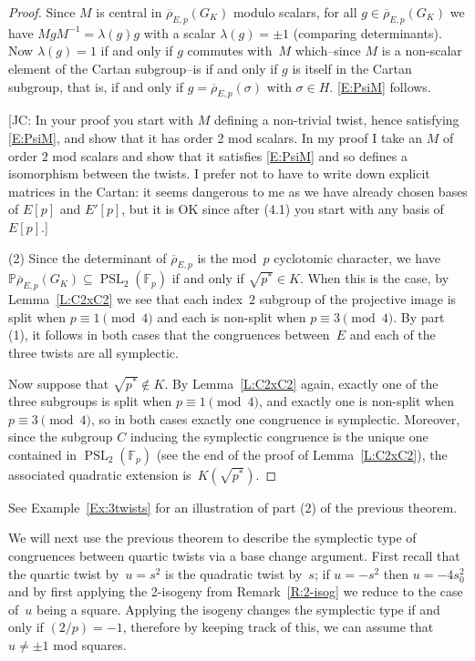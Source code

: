 \documentclass[12pt, reqno]{amsart}
\newcommand{\F}{\mathbb{F}}
\newcommand{\PP}{\mathbb{P}}
\newcommand{\rhobar}{{\overline{\rho}}}
\newcommand{\PSL}{\operatorname{PSL}}
\numberwithin{equation}{section}
\theoremstyle{definition}
\theoremstyle{remark}
\newcommand{\jc}[1]{{\color{darkgreen} \textsf{[JC: #1]}}}
\begin{document}
\begin{proof}
Since $M$ is central in $\rhobar_{E,p}(G_K)$ modulo scalars, for all
$g\in\rhobar_{E,p}(G_K)$ we have $MgM^{-1}=\lambda(g)g$ with a scalar
$\lambda(g)=\pm1$ (comparing determinants).  Now $\lambda(g)=1$ if and
only if $g$ commutes with~$M$ which--since $M$ is a non-scalar element
of the Cartan subgroup--is if and only if $g$ is itself in the Cartan
subgroup, that is, if and only if $g=\rhobar_{E,p}(\sigma)$ with
$\sigma\in H$.  \eqref{E:PsiM} follows.

\jc{In your proof you start with $M$ defining a non-trivial twist,
  hence satisfying \eqref{E:PsiM}, and show that it has order 2 mod
  scalars.  In my proof I take an $M$ of order $2$ mod scalars and
  show that it satisfies \eqref{E:PsiM} and so defines a isomorphism
  between the twists.  I prefer not to have to write down explicit
  matrices in the Cartan: it seems dangerous to me as we have already
  chosen bases of $E[p]$ and $E'[p]$, but it is OK since after (4.1)
  you start with any basis of $E[p]$.}

(2) Since the determinant of $\rhobar_{E,p}$ is the mod~$p$ cyclotomic
character, we have $\PP\rhobar_{E,p}(G_K)\subseteq \PSL_2(\F_p)$ if
and only if $\sqrt{p^*}\in K$.  When this is the case, by
Lemma~\ref{L:C2xC2} we see that each index~$2$ subgroup of the
projective image is split when $p\equiv1\pmod4$ and each is non-split
when $p\equiv3\pmod4$.  By part (1), it follows in both cases that the
congruences between~$E$ and each of the three twists are all
symplectic.

Now suppose that $\sqrt{p^*}\notin K$.  By Lemma~\ref{L:C2xC2} again,
exactly one of the three subgroups is split when $p\equiv1\pmod4$, and
exactly one is non-split when $p\equiv3\pmod4$, so in both cases
exactly one congruence is symplectic.  Moreover, since the subgroup
$C$ inducing the symplectic congruence is the unique one contained in
$\PSL_2(\F_p)$ (see the end of the proof of Lemma~\ref{L:C2xC2}), the
associated quadratic extension is~$K(\sqrt{p^*})$.
\end{proof}

See Example~\ref{Ex:3twists} for an illustration of part (2) of
the previous theorem.


We will next use the previous theorem to describe the symplectic type
of congruences between quartic twists via a base change
argument. First recall that the quartic twist by~$u = s^2$ is the
quadratic twist by~$s$; if $u = -s^2$ then $u = -4s_0^2$ and by first
applying the 2-isogeny from Remark~\ref{R:2-isog} we reduce to the
case of~$u$ being a square. Applying the isogeny changes the
symplectic type if and only if $(2/p) = -1$, therefore by keeping
track of this, we can assume that $u \neq \pm 1$ mod squares.
\end{document}
